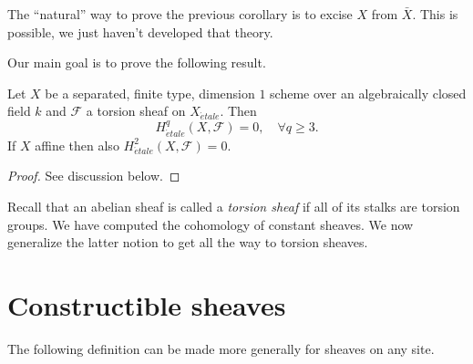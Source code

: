 \begin{remark}
\label{remark-natural-proof}
The ``natural'' way to prove the previous corollary is to excise $X$ from $\bar
X$. This is possible, we just haven't developed that theory.
\end{remark}

\noindent
Our main goal is to prove the following result.

\begin{theorem}
\label{theorem-vanishing-curves}
Let $X$ be a separated, finite type, dimension $1$ scheme over an algebraically
closed field $k$ and $\mathcal{F}$ a torsion sheaf on $X_{\acute{e}tale}$. Then
$$
H_{\acute{e}tale}^q(X, \mathcal{F}) = 0, \quad \forall q\geq 3.
$$
If $X$ affine then also $H_{\acute{e}tale}^2(X, \mathcal{F}) = 0$.
\end{theorem}

\begin{proof}
See discussion below.
\end{proof}

\noindent
Recall that an abelian sheaf is called a {\it torsion sheaf} if all of its
stalks are torsion groups. We have computed the cohomology of constant sheaves.
We now generalize the latter notion to get all the way to torsion sheaves.




\section{Constructible sheaves}
\label{section-constructible}

\noindent
The following definition can be made more generally for sheaves on any site.

